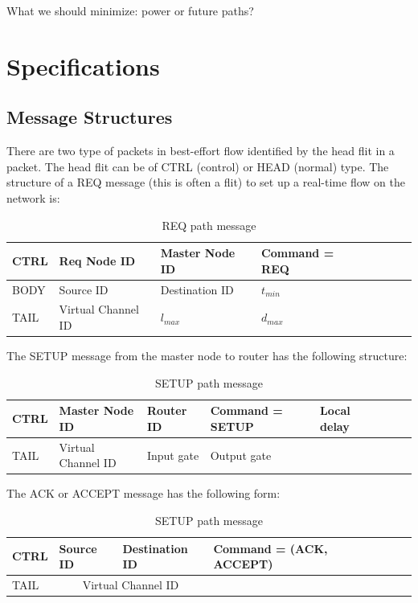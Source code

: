 \documentclass[a4]{article}
\begin{document}
What we should minimize: power or future paths?

\section{Specifications}
\subsection{Message Structures}

There are two type of packets in best-effort flow identified by the head flit
in a packet. The head flit can be of CTRL (control) or HEAD (normal) type. The
structure of a REQ message (this is often a flit) to set up a real-time flow on the network is:

\begin{table}[htbp]
\begin{center}
  \begin{tabular}{ | l | l | l | l | l | l | l | l | }
    \hline
	CTRL & Req Node ID & Master Node ID & Command = REQ \\ \hline
	BODY & Source ID & Destination ID & $t_{min}$ \\ \hline 
	TAIL & Virtual Channel ID & $l_{max}$ & $d_{max}$ \\
    \hline
  \end{tabular}
\end{center}
\caption{REQ path message}
\label{table:PathMsg}
\end{table}

The SETUP message from the master node to router has the following structure:

\begin{table}[htbp]
\begin{center}
  \begin{tabular}{ | l | l | l | l | l | l | l | l | }
    \hline
	CTRL & Master Node ID & Router ID & Command = SETUP & Local delay \\ \hline
	TAIL & Virtual Channel ID & Input gate & Output gate &  \\
    \hline
  \end{tabular}
\end{center}
\caption{SETUP path message}
\label{table:PathMsg}
\end{table}

The ACK or ACCEPT message has the following form:


\begin{table}[htbp]
\begin{center}
  \begin{tabular}{ | l | l | l | l | l | l | l | l | }
    \hline
	CTRL & Source ID & Destination ID & Command = (ACK, ACCEPT) \\ \hline
	TAIL & \multicolumn{2}{|c|}{Virtual Channel ID} &  \\
    \hline
  \end{tabular}
\end{center}
\caption{SETUP path message}
\label{table:PathMsg}
\end{table}
\end{document}
